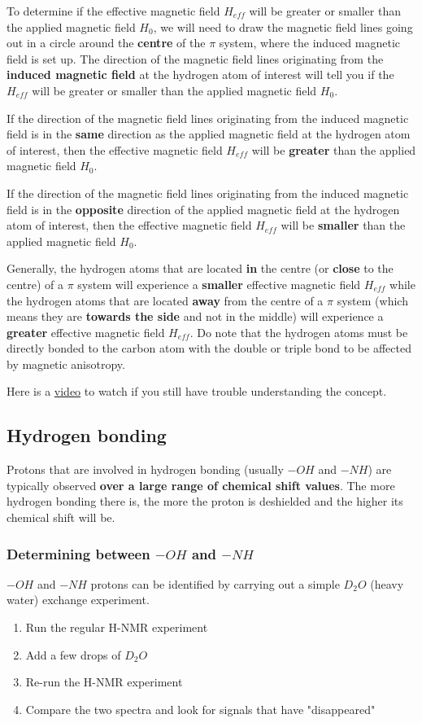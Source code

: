 \documentclass[11pt]{article}
\begin{document}
To determine if the effective magnetic field \(H_{eff}\) will be greater or smaller than the applied magnetic field \(H_{0}\), we will need to draw the magnetic field lines going out in a circle around the \textbf{centre} of the \(\pi\) system, where the induced magnetic field is set up. The direction of the magnetic field lines originating from the \textbf{induced magnetic field} at the hydrogen atom of interest will tell you if the \(H_{eff}\) will be greater or smaller than the applied magnetic field \(H_{0}\).


If the direction of the magnetic field lines originating from the induced magnetic field is in the \textbf{same} direction as the applied magnetic field at the hydrogen atom of interest, then the effective magnetic field \(H_{eff}\) will be \textbf{greater} than the applied magnetic field \(H_{0}\).


If the direction of the magnetic field lines originating from the induced magnetic field is in the \textbf{opposite} direction of the applied magnetic field at the hydrogen atom of interest, then the effective magnetic field \(H_{eff}\) will be \textbf{smaller} than the applied magnetic field \(H_{0}\).


Generally, the hydrogen atoms that are located \textbf{in} the centre (or \textbf{close} to the centre) of a \(\pi\) system will experience a \textbf{smaller} effective magnetic field \(H_{eff}\) while the hydrogen atoms that are located \textbf{away} from the centre of a \(\pi\) system (which means they are \textbf{towards the side} and not in the middle) will experience a \textbf{greater} effective magnetic field \(H_{eff}\). Do note that the hydrogen atoms must be directly bonded to the carbon atom with the double or triple bond to be affected by magnetic anisotropy.


Here is a \href{https://youtu.be/w8ew5bvdrqg}{video} to watch if you still have trouble understanding the concept.
\subsection{Hydrogen bonding}
\label{sec:orgac65f08}
Protons that are involved in hydrogen bonding (usually \(-OH\) and \(-NH\)) are typically observed \textbf{over a large range of chemical shift values}. The more hydrogen bonding there is, the more the proton is deshielded and the higher its chemical shift will be.
\subsubsection{Determining between \(-OH\) and \(-NH\)}
\label{sec:orge99f237}
\(-OH\) and \(-NH\) protons can be identified by carrying out a simple \(D_2O\) (heavy water) exchange experiment.
\begin{enumerate}
\item Run the regular H-NMR experiment
\item Add a few drops of \(D_2O\)
\item Re-run the H-NMR experiment
\item Compare the two spectra and look for signals that have "disappeared"
\end{enumerate}
\end{document}
